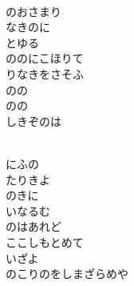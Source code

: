 \documentclass[10pt,b5j]{tarticle} %
\begin{document}
\begin{enumerate}
\begin{minipage}[c]{\blocksize}
        \vspace{\linespace}
        \item~\\
        のおさまり\\
        なきのに\\
        とゆる\\
        ののにこほりて\\
        りなきをさそふ\\
        のの\\
        のの\\
        しきぞのは
        
        \vspace{\linespace}
        \item~\\
        にふの\\
        たりきよ\\
        のきに\\
        いなるむ\\
        のはあれど\\
        ここしもとめて\\
        いざよ\\
        のこりのをしまざらめや
    
    \end{minipage}
\end{enumerate} %
\end{document}
